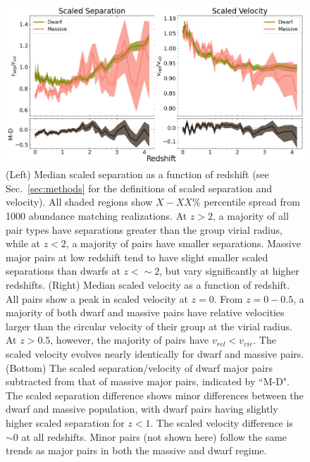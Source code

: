 \documentclass[twocolumn]{aastex631}
\begin{document}
    \begin{figure}[htp]
      \centering
      \includegraphics[width=\textwidth]{scaledcombo_1000.png}
      \caption{
      (Left) Median scaled separation as a function of redshift (see Sec.~\ref{sec:methods} for the definitions of scaled separation and velocity). All shaded regions show $X-XX\%$ percentile spread from 1000 abundance matching realizations. 
      At $z>2$, a majority of all pair types have separations greater than the group virial radius, while at $z<2$, a majority of pairs have smaller separations.  
      Massive major pairs at low redshift tend to have slight smaller scaled separations than dwarfs at $z<\sim2$, but vary significantly at higher redshifts. 
      (Right) Median scaled velocity as a function of redshift.
      All pairs show a peak in scaled velocity at $z=0$. From $z=0-0.5$, a majority of both dwarf and massive pairs have relative velocities larger than the circular velocity of their group at the virial radius. At $z>0.5$, however, the majority of pairs have $v_{rel}<v_{vir}$. The scaled velocity evolves nearly identically for dwarf and massive pairs.
      (Bottom) The scaled separation/velocity of dwarf major pairs subtracted from that of massive major pairs, indicated by ``M-D".
      The scaled separation difference shows minor differences between the dwarf and massive population, with dwarf pairs having slightly higher scaled separation for $z<1$. The scaled velocity difference is $\sim0$ at all redshifts.
      Minor pairs (not shown here) follow the same trends as major pairs in both the massive and dwarf regime.
        }
      \label{fig:scaled}
    \end{figure}
\end{document}
